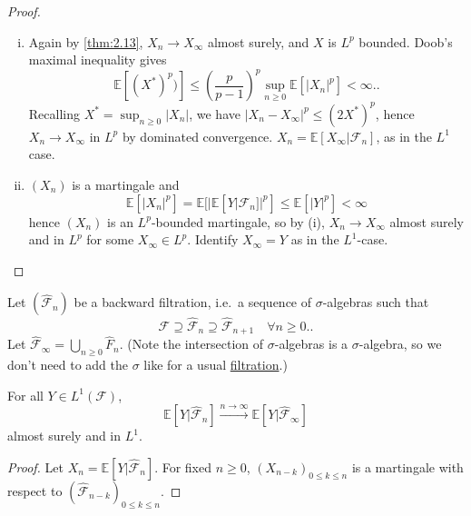 \documentclass{article}
\newcommand{\F}{\mathcal{F}}
\newcommand{\1}[1]{\mathbbm{1}_{#1}}
\newcommand{\E}{\mathbb{E}}
\begin{document}
\begin{proof}
  \begin{enumerate}[(i)]
    \item Again by \cref{thm:2.13}, $X_n \to X_\infty$ almost surely, and $X$ is $L^p$ bounded.
      Doob's maximal inequality %
      gives
      \begin{equation*}
        \E[(X^*)^p)] \leq (\frac{p}{p-1})^p \sup_{n \geq 0} \E[|X_n|^p] < \infty.
      .\end{equation*}
      Recalling $X^* = \sup_{n \geq 0} |X_n|$, we have $|X_n - X_\infty|^p \leq (2 X^*)^p$, hence $X_n \to X_\infty$ in $L^p$ by dominated convergence.
      $X_n = \E[X_\infty | \F_n]$, as in the $L^1$ case.
    \item $(X_n)$ is a martingale and
      \begin{equation*}
        \E[|X_n|^p] = \E[|\E[Y | \F_n]|^p] \leq \E[|Y|^p] < \infty
      \end{equation*}
      hence $(X_n)$ is an $L^p$-bounded martingale, so by (i), $X_n \to X_\infty$ almost surely and in $L^p$ for some $X_\infty \in L^p$.
      Identify $X_\infty = Y$ as in the $L^1$-case.
  \end{enumerate}
\end{proof}
Let $(\hat{\F}_n)$ be a backward filtration, i.e.\ a sequence of $\sigma$-algebras such that
\begin{equation*}
  \F \supseteq \hat{\F}_n \supseteq \hat{\F}_{n+1} \quad \forall n \geq 0.
.\end{equation*}
Let $\hat{\F}_\infty = \bigcup_{n \geq 0} \hat{F}_n$. (Note the intersection of $\sigma$-algebras is a $\sigma$-algebra, so we don't need to add the $\sigma$ like for a usual \hyperlink{def:filtration}{filtration}.)
\begin{nthm}\label{thm:2.16}
  For all $Y \in L^1(\F)$,
  \begin{equation*}
    \E[Y | \hat{\F}_n] \xrightarrow{n \to \infty} \E[Y | \hat{\F}_\infty]
  \end{equation*}
  almost surely and in $L^1$.
\end{nthm}
\begin{proof}
  Let $X_n = \E[Y | \hat{\F}_n]$. For fixed $n \geq 0$, $(X_{n-k})_{0 \leq k \leq n}$ is a martingale with respect to $(\hat{\F}_{n-k})_{0 \leq k \leq n}$.
\end{proof}
\printindex
\end{document}
